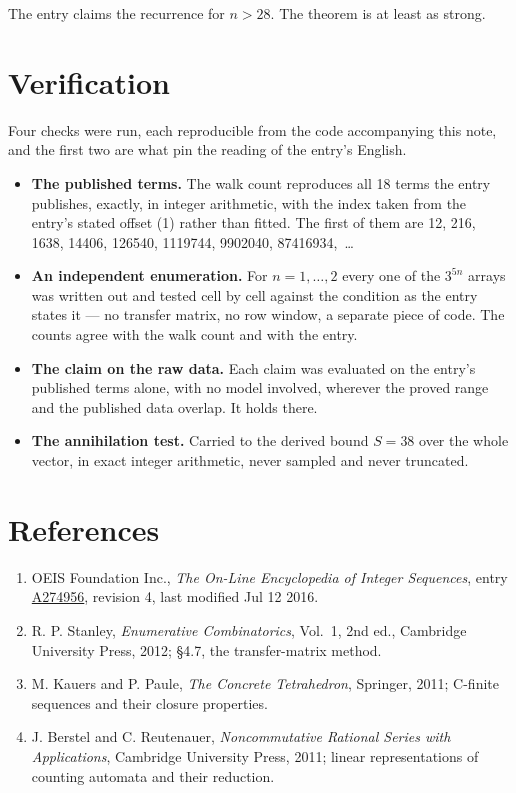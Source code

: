\documentclass[11pt]{article}
\theoremstyle{definition}
\begin{document}
The entry claims the recurrence for $n > 28$. The theorem is at least as strong.

\section{Verification}

Four checks were run, each reproducible from the code accompanying this note, and the first two are what pin the reading of the entry's English.

\begin{itemize}

\item {\bfseries The published terms.} The walk count reproduces all 18 terms the entry publishes, exactly, in integer arithmetic, with the index taken from the entry's stated offset (1) rather than fitted. The first of them are 12, 216, 1638, 14406, 126540, 1119744, 9902040, 87416934,~\dots

\item {\bfseries An independent enumeration.} For $n = 1,\dots,2$ every one of the $3^{5n}$ arrays was written out and tested cell by cell against the condition as the entry states it --- no transfer matrix, no row window, a separate piece of code. The counts agree with the walk count and with the entry.

\item {\bfseries The claim on the raw data.} Each claim was evaluated on the entry's published terms alone, with no model involved, wherever the proved range and the published data overlap. It holds there.

\item {\bfseries The annihilation test.} Carried to the derived bound $S = 38$ over the whole vector, in exact integer arithmetic, never sampled and never truncated.

\end{itemize}

\section{References}

\begin{enumerate}

\item OEIS Foundation Inc., \emph{The On-Line Encyclopedia of Integer Sequences}, entry \href{https://oeis.org/A274956}{A274956}, revision 4, last modified Jul 12 2016.

\item R. P. Stanley, \emph{Enumerative Combinatorics}, Vol.~1, 2nd ed., Cambridge University Press, 2012; \S4.7, the transfer-matrix method.

\item M. Kauers and P. Paule, \emph{The Concrete Tetrahedron}, Springer, 2011; C-finite sequences and their closure properties.

\item J. Berstel and C. Reutenauer, \emph{Noncommutative Rational Series with Applications}, Cambridge University Press, 2011; linear representations of counting automata and their reduction.

\end{enumerate}
\end{document}
